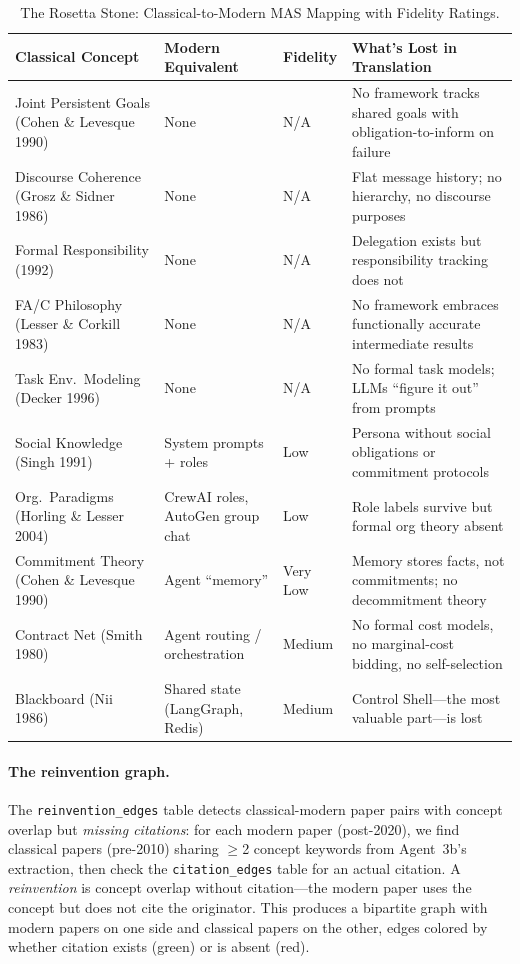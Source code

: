 \documentclass{article}
\begin{document}
\begin{table}[t]
\centering
\caption{The Rosetta Stone: Classical-to-Modern MAS Mapping with Fidelity Ratings.}
\label{tab:rosetta}
\small
\begin{tabular}{@{} p{4cm} p{3.5cm} l p{5.5cm} @{}}
\toprule
\textbf{Classical Concept} & \textbf{Modern Equivalent} & \textbf{Fidelity} & \textbf{What's Lost in Translation} \\
\midrule
Joint Persistent Goals (Cohen \& Levesque 1990) & None & N/A & No framework tracks shared goals with obligation-to-inform on failure \\
Discourse Coherence (Grosz \& Sidner 1986) & None & N/A & Flat message history; no hierarchy, no discourse purposes \\
Formal Responsibility (1992) & None & N/A & Delegation exists but responsibility tracking does not \\
FA/C Philosophy (Lesser \& Corkill 1983) & None & N/A & No framework embraces functionally accurate intermediate results \\
Task Env.\ Modeling (Decker 1996) & None & N/A & No formal task models; LLMs ``figure it out'' from prompts \\
\midrule
Social Knowledge (Singh 1991) & System prompts + roles & Low & Persona without social obligations or commitment protocols \\
Org.\ Paradigms (Horling \& Lesser 2004) & CrewAI roles, AutoGen group chat & Low & Role labels survive but formal org theory absent \\
Commitment Theory (Cohen \& Levesque 1990) & Agent ``memory'' & Very Low & Memory stores facts, not commitments; no decommitment theory \\
\midrule
Contract Net (Smith 1980) & Agent routing / orchestration & Medium & No formal cost models, no marginal-cost bidding, no self-selection \\
Blackboard (Nii 1986) & Shared state (LangGraph, Redis) & Medium & Control Shell---the most valuable part---is lost \\
\bottomrule
\end{tabular}
\end{table}

\paragraph{The reinvention graph.}
The \texttt{reinvention\_edges} table detects classical-modern paper pairs with concept
overlap but \emph{missing citations}: for each modern paper (post-2020), we find
classical papers (pre-2010) sharing $\geq$2 concept keywords from Agent~3b's extraction,
then check the \texttt{citation\_edges} table for an actual citation. A
\emph{reinvention} is concept overlap without citation---the modern paper uses the
concept but does not cite the originator. This produces a bipartite graph
with modern papers on one side and classical papers on the other, edges colored by
whether citation exists (green) or is absent (red).%
\end{document}
